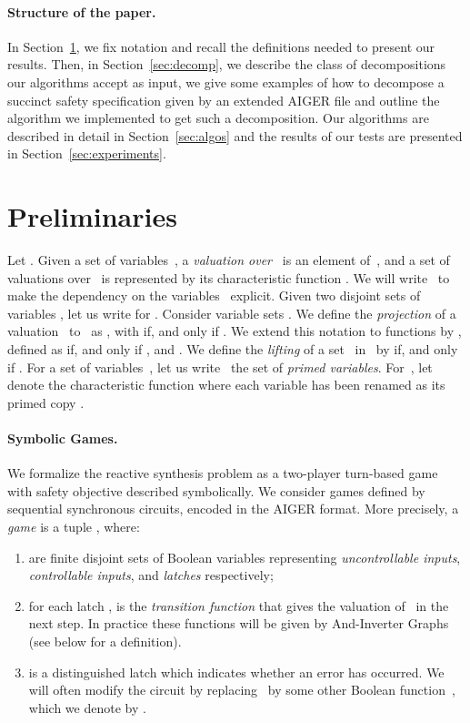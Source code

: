 \documentclass[submission,copyright,creativecommons]{eptcs}
\begin{document}
\paragraph{Structure of the paper.}
In Section~\ref{sec:prelim}, we fix notation and recall the definitions needed to
present our results. Then, in Section~\ref{sec:decomp}, we describe the class of
decompositions our algorithms accept as input, we give some examples of how to
decompose a succinct safety specification given by an extended AIGER file and
outline the algorithm we implemented to get such a decomposition. Our algorithms
are described in detail in Section~\ref{sec:algos} and the results of our tests
are presented in Section~\ref{sec:experiments}.
      
\section{Preliminaries}\label{sec:prelim}
Let . Given a set of variables~, 
a \emph{valuation over~} is an element of~,
and a set of valuations over~ is represented by its characteristic function
. We will write~
to make the dependency on the variables~ explicit.
Given two disjoint sets of variables , let us write
 for .
Consider variable sets .
We define the \emph{projection} of a valuation~
to~ as , with 
if, and only if .
We extend this notation to 
functions  by
, 
defined as  if, and only if , and .
We define the \emph{lifting} of a set~
in~ by  if, and only if .
For a set of variables~, let us
write~ the set of \emph{primed variables}.  For~,
let  denote the characteristic function  where each variable  has been renamed as its primed copy .

\paragraph{Symbolic Games.}
We formalize the reactive synthesis problem as a two-player turn-based game
with safety objective described symbolically. We consider games
defined by sequential synchronous circuits, encoded in the AIGER format.
More precisely, a \emph{game} is a tuple , where:

\begin{enumerate}
\item  are finite disjoint sets of Boolean variables representing
	\emph{uncontrollable inputs}, \emph{controllable inputs}, and
	\emph{latches} respectively;
\item for each latch ,  is the \emph{transition
	function} that gives the valuation of~ in the next step. In practice
	these functions will be
	given by And-Inverter Graphs (see below for a definition).
\item   is a distinguished latch which indicates whether an error
	has occurred.  We will often modify the circuit by replacing~ by
	some other Boolean function~, which we denote by .
\end{enumerate}
\end{document}
